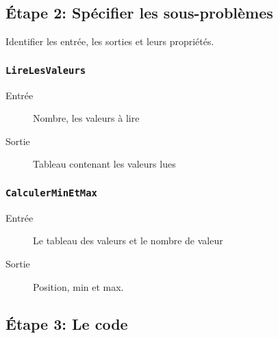 \documentclass[12pt,a4paper,openany]{article}
\begin{document}
\subsection{\'Etape 2: Spécifier les sous-problèmes}
Identifier les entrée, les sorties et leurs propriétés.
\subsubsection{\texttt{LireLesValeurs}}
\begin{description}
	\item[Entrée] Nombre, les valeurs à lire
	\item[Sortie] Tableau contenant les valeurs lues
\end{description}
\subsubsection{\texttt{CalculerMinEtMax}}
\begin{description}
	\item[Entrée] Le tableau des valeurs et le nombre de valeur 
	\item[Sortie] Position, min et max. 
\end{description}
\newpage
\subsection{\'Etape 3: Le code}

\end{document}
